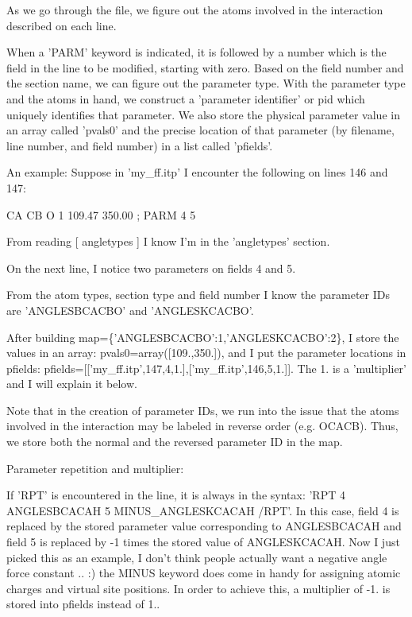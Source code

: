 \-As we go through the file, we figure out the atoms involved in the interaction described on each line.

\-When a '\-P\-A\-R\-M' keyword is indicated, it is followed by a number which is the field in the line to be modified, starting with zero. \-Based on the field number and the section name, we can figure out the parameter type. \-With the parameter type and the atoms in hand, we construct a 'parameter identifier' or pid which uniquely identifies that parameter. \-We also store the physical parameter value in an array called 'pvals0' and the precise location of that parameter (by filename, line number, and field number) in a list called 'pfields'.

\-An example\-: \-Suppose in 'my\-\_\-ff.\-itp' \-I encounter the following on lines 146 and 147\-:


\begin{DoxyCode}
     [ angletypes ]
     CA   CB   O   1   109.47  350.00  ; PARM 4 5
\end{DoxyCode}


\-From reading {\ttfamily \mbox{[} angletypes \mbox{]}} \-I know \-I'm in the 'angletypes' section.

\-On the next line, \-I notice two parameters on fields 4 and 5.

\-From the atom types, section type and field number \-I know the parameter \-I\-Ds are {\ttfamily '\-A\-N\-G\-L\-E\-S\-B\-C\-A\-C\-B\-O'} and {\ttfamily '\-A\-N\-G\-L\-E\-S\-K\-C\-A\-C\-B\-O'}.

\-After building {\ttfamily map=\{'\-A\-N\-G\-L\-E\-S\-B\-C\-A\-C\-B\-O'\-:1,'\-A\-N\-G\-L\-E\-S\-K\-C\-A\-C\-B\-O'\-:2\}}, \-I store the values in an array\-: {\ttfamily pvals0=array(\mbox{[}109.,350.\mbox{]})}, and \-I put the parameter locations in pfields\-: {\ttfamily pfields=\mbox{[}\mbox{[}'my\-\_\-ff.\-itp',147,4,1.\mbox{]},\mbox{[}'my\-\_\-ff.\-itp',146,5,1.\mbox{]}\mbox{]}}. \-The 1. is a 'multiplier' and \-I will explain it below.

\-Note that in the creation of parameter \-I\-Ds, we run into the issue that the atoms involved in the interaction may be labeled in reverse order (e.\-g. {\ttfamily \-O\-C\-A\-C\-B}). \-Thus, we store both the normal and the reversed parameter \-I\-D in the map.

\-Parameter repetition and multiplier\-:

\-If {\ttfamily '\-R\-P\-T'} is encountered in the line, it is always in the syntax\-: {\ttfamily '\-R\-P\-T 4 \-A\-N\-G\-L\-E\-S\-B\-C\-A\-C\-A\-H 5 \-M\-I\-N\-U\-S\-\_\-\-A\-N\-G\-L\-E\-S\-K\-C\-A\-C\-A\-H /\-R\-P\-T'}. \-In this case, field 4 is replaced by the stored parameter value corresponding to {\ttfamily \-A\-N\-G\-L\-E\-S\-B\-C\-A\-C\-A\-H} and field 5 is replaced by -\/1 times the stored value of {\ttfamily \-A\-N\-G\-L\-E\-S\-K\-C\-A\-C\-A\-H}. \-Now \-I just picked this as an example, \-I don't think people actually want a negative angle force constant .. \-:) the {\ttfamily \-M\-I\-N\-U\-S} keyword does come in handy for assigning atomic charges and virtual site positions. \-In order to achieve this, a multiplier of -\/1. is stored into pfields instead of 1..

